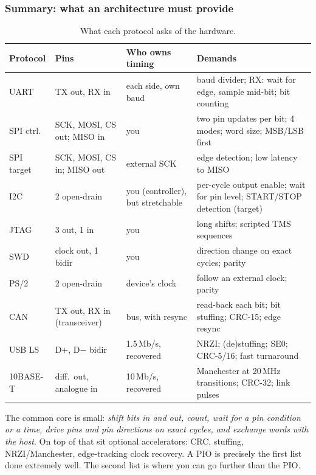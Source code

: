\subsubsection{Summary: what an architecture must provide}
\begin{table}[ht]
\centering
\small
\begin{tabular}{|p{2.1cm}|p{3.0cm}|p{3.2cm}|p{5.6cm}|}
\hline
Protocol & Pins & Who owns timing & Demands \\ \hline
UART & TX out, RX in & each side, own baud & baud divider; RX: wait for edge,
  sample mid-bit; bit counting \\ \hline
SPI ctrl. & SCK, MOSI, CS out; MISO in & you & two pin updates per bit;
  4 modes; word size; MSB/LSB first \\ \hline
SPI target & SCK, MOSI, CS in; MISO out & external SCK & edge detection;
  low latency to MISO \\ \hline
I2C & 2 open-drain & you (controller), but stretchable & per-cycle output
  enable; wait for pin level; START/STOP detection (target) \\ \hline
JTAG & 3 out, 1 in & you & long shifts; scripted TMS sequences \\ \hline
SWD & clock out, 1 bidir & you & direction change on exact cycles; parity
  \\ \hline
PS/2 & 2 open-drain & device's clock & follow an external clock; parity \\
  \hline
CAN & TX out, RX in (transceiver) & bus, with resync & read-back each bit;
  bit stuffing; CRC-15; edge resync \\ \hline
USB LS & D+, D$-$ bidir & 1.5\,Mb/s, recovered & NRZI; (de)stuffing; SE0;
  CRC-5/16; fast turnaround \\ \hline
10BASE-T & diff.\ out, analogue in & 10\,Mb/s, recovered & Manchester at
  20\,MHz transitions; CRC-32; link pulses \\ \hline
\end{tabular}
\caption{What each protocol asks of the hardware.}\label{tab:needs}
\end{table}

The common core is small: \emph{shift bits in and out, count, wait for a pin
condition or a time, drive pins and pin directions on exact cycles, and
exchange words with the host}. On top of that sit optional accelerators:
CRC, stuffing, NRZI/Manchester, edge-tracking clock recovery. A PIO is
precisely the first list done extremely well. The second list is where you
can go further than the PIO.

